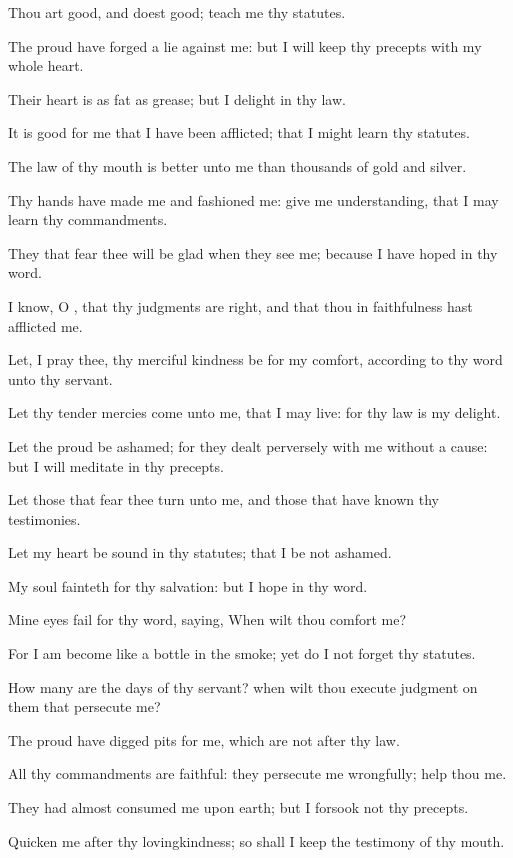 \verse Thou art good, and doest good; teach me thy statutes.

\verse The proud have forged a lie against me: but I will keep thy precepts with my whole heart.

\verse Their heart is as fat as grease; but I delight in thy law.

\verse It is good for me that I have been afflicted; that I might learn thy statutes.

\verse The law of thy mouth is better unto me than thousands of gold and silver.

\verse Thy hands have made me and fashioned me: give me understanding, that I may learn thy commandments.

\verse They that fear thee will be glad when they see me; because I have hoped in thy word.

\verse I know, O \LORD, that thy judgments are right, and that thou in faithfulness hast afflicted me.

\verse Let, I pray thee, thy merciful kindness be for my comfort, according to thy word unto thy servant.

\verse Let thy tender mercies come unto me, that I may live: for thy law is my delight.

\verse Let the proud be ashamed; for they dealt perversely with me without a cause: but I will meditate in thy precepts.

\verse Let those that fear thee turn unto me, and those that have known thy testimonies.

\verse Let my heart be sound in thy statutes; that I be not ashamed.

\verse My soul fainteth for thy salvation: but I hope in thy word.

\verse Mine eyes fail for thy word, saying, When wilt thou comfort me?

\verse For I am become like a bottle in the smoke; yet do I not forget thy statutes.

\verse How many are the days of thy servant? when wilt thou execute judgment on them that persecute me?

\verse The proud have digged pits for me, which are not after thy law.

\verse All thy commandments are faithful: they persecute me wrongfully; help thou me.

\verse They had almost consumed me upon earth; but I forsook not thy precepts.

\verse Quicken me after thy lovingkindness; so shall I keep the testimony of thy mouth.

